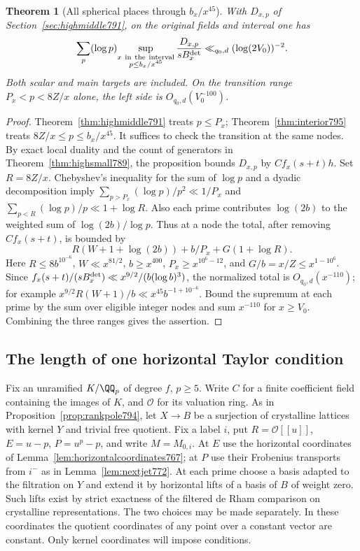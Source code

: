 \documentclass[a4paper,11pt]{article}
\newtheorem{theorem}[proposition]{Theorem}
\theoremstyle{definition}
\theoremstyle{remark}
\numberwithin{equation}{section}
\begin{document}
\begin{theorem}[All spherical places through \(b_x/x^{45}\)]
\leavevmode\label{thm:transitionrange796}
With \(D_{x,p}\) of Section~\ref{sec:highmiddle791}, on the
original fields and interval one has
\[
   \sum_p(\log p)\!
        \sup_{\substack{x\ {\rm in\ the\ interval}\\p\le b_x/x^{45}}}
          \frac{D_{x,p}}{sB_x^{\rm det}}
                 \ll_{q_0,d}(\log(2V_0))^{-2}.
\]
Both scalar and main targets are included. On the transition
range \(P_x<p<8Z/x\) alone, the left side is
\(O_{q_0,d}(V_0^{-100})\).
\end{theorem}
\begin{proof}
Theorem~\ref{thm:highmiddle791} treats \(p\le P_x\);
Theorem~\ref{thm:interior795} treats \(8Z/x\le p\le b_x/x^{45}\).
It suffices to check the transition at the same nodes.
By exact local duality and the count of generators in
Theorem~\ref{thm:highsmall789}, the proposition bounds
\(D_{x,p}\) by \(C f_x(s+t)h\).
Set \(R=8Z/x\). Chebyshev's inequality for the sum of
\(\log p\) and a dyadic decomposition imply
\(\sum_{p>P_x}(\log p)/p^2\ll1/P_x\) and
\(\sum_{p<R}(\log p)/p\ll 1+\log R\).
Also each prime contributes \(\log(2b)\) to the weighted
sum of \(\log(2b)/\log p\). Thus at a node the total, after
removing \(Cf_x(s+t)\), is bounded by
\[
        R(W+1+\log(2b))+b/P_x+G(1+\log R).
\]
Here \(R\le8b^{10^{-6}}\), \(W\ll x^{81/2}\),
\(b\ge x^{400}\), \(P_x\ge x^{10^6-12}\), and
\(G/b=x/Z\le x^{1-10^6}\). Since
\(f_x(s+t)/(sB_x^{\rm det})\ll x^{9/2}/(b(\log b)^3)\),
the normalized total is \(O_{q_0,d}(x^{-110})\);
for example \(x^{9/2}R(W+1)/b\ll x^{45}b^{-1+10^{-6}}\).
Bound the supremum at each prime by the sum over eligible
integer nodes and sum \(x^{-110}\) for \(x\ge V_0\).
Combining the three ranges gives the assertion.
\end{proof}
\clearpage

\subsection{The length of one horizontal Taylor condition}
\label{sec:jetlength797}
Fix an unramified \(K/\QQ_p\) of degree \(f\), \(p\ge5\).
Write \(C\) for a finite coefficient field containing the images
of \(K\), and \(\mathcal O\) for its valuation ring. As in
Proposition~\ref{prop:rankpole794}, let \(X\to B\) be a surjection
of crystalline lattices with kernel \(Y\) and trivial free quotient.
Fix a label \(i\), put \(R=\mathcal O[[u]]\), \(E=u-p\),
\(P=u^p-p\), and write \(M=M_{0,i}\).
At \(E\) use the horizontal coordinates of
Lemma~\ref{lem:horizontalcoordinates767}; at \(P\) use their
Frobenius transports from \(i^-\) as in Lemma~\ref{lem:nextjet772}.
At each prime choose a basis adapted to the filtration on \(Y\)
and extend it by horizontal lifts of a basis of \(B\) of weight
zero. Such lifts exist by strict exactness of the filtered
de Rham comparison on crystalline representations. The two
choices may be made separately. In these coordinates the
quotient coordinates of any point over a constant vector are
constant. Only kernel coordinates will impose conditions.
\end{document}
